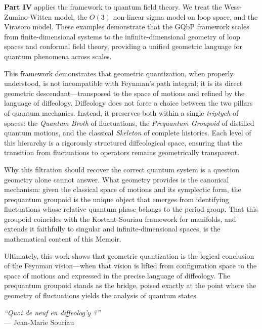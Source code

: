 \documentclass[10pt,reqno,letterpaper,twoside]{amsbook}
\begin{document}
  \textbf{Part IV} applies the framework to quantum field theory.
  We treat the Wess-Zumino-Witten model,
  the $O(3)$ non-linear sigma model on loop space,
  and the Virasoro model.
  These examples demonstrate that the GQbP framework scales from finite-dimensional systems to the infinite-dimensional geometry of loop spaces and conformal field theory,
  providing a unified geometric language for quantum phenomena across scales.
  
  This framework demonstrates that geometric quantization,
  when properly understood,
  is not incompatible with Feynman's path integral;
  it is its direct geometric descendant---transposed to the space of motions and refined by the language of diffeology.
  Diffeology does not force a choice between the two pillars of quantum mechanics.
  Instead,
  it preserves both within a single \emph{triptych} of spaces:
  the \emph{Quantum Broth} of fluctuations,
  the \emph{Prequantum Groupoid} of distilled quantum motions,
  and the classical \emph{Skeleton} of complete histories.
  Each level of this hierarchy is a rigorously structured diffeological space,
  ensuring that the transition from fluctuations to operators remains geometrically transparent.
  
  Why this filtration should recover the correct quantum system is a question geometry alone cannot answer.
  What geometry provides is the canonical mechanism:
  given the classical space of motions and its symplectic form,
  the prequantum groupoid is the unique object that emerges from identifying fluctuations whose relative quantum phase belongs to the period group.
  That this groupoid coincides with the Kostant-Souriau framework for manifolds,
  and extends it faithfully to singular and infinite-dimensional spaces,
  is the mathematical content of this Memoir.
  
  Ultimately,
  this work shows that geometric quantization is the logical conclusion of the Feynman vision---when that vision is lifted from configuration space to the space of motions and expressed in the precise language of diffeology.
  The prequantum groupoid stands as the bridge,
  poised exactly at the point where the geometry of fluctuations yields the analysis of quantum states.
  
  \vspace{2em}
  \begin{flushright}
    \emph{``Quoi de neuf en diffeolog'y ?''} \\
    --- Jean-Marie Souriau
  \end{flushright}
  
\end{document}
